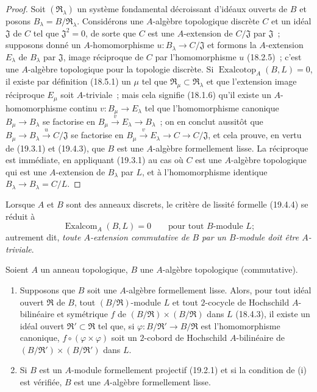 \begin{proof}
Soit $(\mathfrak R_\lambda)$ un système fondamental décroissant d'idéaux
ouverts de $B$ et posons $B_\lambda=B/\mathfrak R_\lambda$.
Considérons une $A$-algèbre topologique discrète $C$ et un idéal
$\mathfrak J$ de $C$ tel que $\mathfrak J^2=0$, de sorte que $C$ est une
$A$-extension de $C/\mathfrak J$ par $\mathfrak J$~; supposons donné un
$A$-homomorphisme $u:B_\lambda\to C/\mathfrak J$ et formons la
$A$-extension $E_\lambda$ de $B_\lambda$ par $\mathfrak J$, image
réciproque de $C$ par l'homomorphisme $u$ (18.2.5)~; c'est une $A$-algèbre
topologique pour la topologie discrète. Si
$\operatorname{Exalcotop}_A(B,L)=0$, il existe par définition (18.5.1) un
$\mu$ tel que $\mathfrak R_\mu\subset\mathfrak R_\lambda$ et que
l'extension image réciproque $E_\mu$ soit $A$-triviale~; mais cela signifie
(18.1.6) qu'il existe un $A$-homomorphisme continu
$v:B_\mu\to E_\lambda$ tel que l'homomorphisme canonique
$B_\mu\to B_\lambda$ se factorise en
$B_\mu\xrightarrow{v}E_\lambda\to B_\lambda$~; on en conclut
aussitôt que $B_\mu\to B_\lambda\xrightarrow{u}C/\mathfrak J$ se
factorise en
$B_\mu\xrightarrow{v}E_\lambda\to C\to C/\mathfrak J$, et cela
prouve, en vertu de (19.3.1) et (19.4.3), que $B$ est une $A$-algèbre
formellement lisse. La réciproque est immédiate, en appliquant (19.3.1) au cas
où $C$ est une $A$-algèbre topologique qui est une $A$-extension de
$B_\lambda$ par $L$, et à l'homomorphisme identique
$B_\lambda\to B_\lambda=C/L$.
\end{proof}

Lorsque $A$ et $B$ sont des anneaux discrets, le critère de lissité formelle
(19.4.4) se réduit à
\begin{equation}
\tag{19.4.4.1}
\label{0.19.4.4.1-fr}
\operatorname{Exalcom}_A(B,L)=0\qquad\text{pour tout $B$-module $L$};
\end{equation}
autrement dit, \emph{toute $A$-extension commutative de $B$ par un
$B$-module doit être $A$-triviale}.

\begin{corollary}[19.4.5]
\label{0.19.4.5-fr}
Soient $A$ un anneau topologique, $B$ une $A$-algèbre topologique
(commutative).
\begin{enumerate}
  \item[(i)] Supposons que $B$ soit une $A$-algèbre formellement lisse.
  Alors, pour tout idéal ouvert $\mathfrak R$ de $B$, tout
  $(B/\mathfrak R)$-module $L$ et tout $2$-cocycle de Hochschild
  $A$-bilinéaire et symétrique $f$ de
  $(B/\mathfrak R)\times(B/\mathfrak R)$ dans $L$ (18.4.3), il existe un
  idéal ouvert $\mathfrak R'\subset\mathfrak R$ tel que, si
  $\varphi:B/\mathfrak R'\to B/\mathfrak R$ est l'homomorphisme
  canonique, $f\circ(\varphi\times\varphi)$ soit un $2$-cobord de
  Hochschild $A$-bilinéaire de
  $(B/\mathfrak R')\times(B/\mathfrak R')$ dans $L$.
  \item[(ii)] Si $B$ est un $A$-module formellement projectif (19.2.1) et si
  la condition de (i) est vérifiée, $B$ est une $A$-algèbre formellement
  lisse.
\end{enumerate}
\end{corollary}

